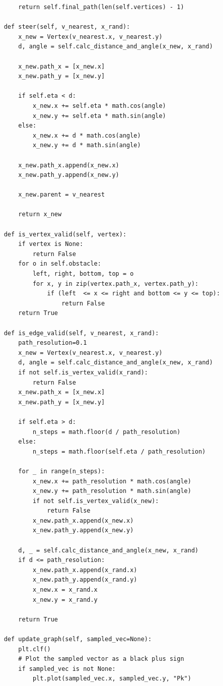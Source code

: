 \documentclass{article}
\begin{document}
\begin{verbatim}
        return self.final_path(len(self.vertices) - 1)

    def steer(self, v_nearest, x_rand):
        x_new = Vertex(v_nearest.x, v_nearest.y)
        d, angle = self.calc_distance_and_angle(x_new, x_rand)

        x_new.path_x = [x_new.x]
        x_new.path_y = [x_new.y]

        if self.eta < d:
            x_new.x += self.eta * math.cos(angle)
            x_new.y += self.eta * math.sin(angle)
        else:
            x_new.x += d * math.cos(angle)
            x_new.y += d * math.sin(angle)

        x_new.path_x.append(x_new.x)
        x_new.path_y.append(x_new.y)

        x_new.parent = v_nearest 

        return x_new

    def is_vertex_valid(self, vertex):
        if vertex is None:
            return False
        for o in self.obstacle:
            left, right, bottom, top = o
            for x, y in zip(vertex.path_x, vertex.path_y):
                if (left  <= x <= right and bottom <= y <= top):
                    return False  
        return True  

    def is_edge_valid(self, v_nearest, x_rand):
        path_resolution=0.1
        x_new = Vertex(v_nearest.x, v_nearest.y)
        d, angle = self.calc_distance_and_angle(x_new, x_rand)
        if not self.is_vertex_valid(x_rand):
            return False
        x_new.path_x = [x_new.x]
        x_new.path_y = [x_new.y]

        if self.eta > d:
            n_steps = math.floor(d / path_resolution)
        else:
            n_steps = math.floor(self.eta / path_resolution)

        for _ in range(n_steps):
            x_new.x += path_resolution * math.cos(angle)
            x_new.y += path_resolution * math.sin(angle)
            if not self.is_vertex_valid(x_new):
                return False
            x_new.path_x.append(x_new.x)
            x_new.path_y.append(x_new.y)

        d, _ = self.calc_distance_and_angle(x_new, x_rand)
        if d <= path_resolution:
            x_new.path_x.append(x_rand.x)
            x_new.path_y.append(x_rand.y)
            x_new.x = x_rand.x
            x_new.y = x_rand.y

        return True

    def update_graph(self, sampled_vec=None):
        plt.clf()
        # Plot the sampled vector as a black plus sign
        if sampled_vec is not None:
            plt.plot(sampled_vec.x, sampled_vec.y, "Pk")


\end{verbatim}
\end{document}
